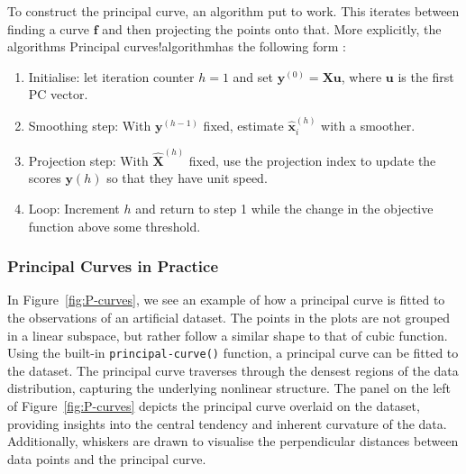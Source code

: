 \documentclass{article}\usepackage[]{graphicx}\usepackage[]{xcolor}
\numberwithin{equation}{section}
\begin{document}
\noindent To construct the principal curve, an algorithm put to work. This iterates between finding a curve $\mathbf{f}$ and then projecting the points onto that. More explicitly, the algorithms {Principal curves!algorithm}has the following form \cite{jolliffe2003principal}: 

\begin{enumerate}
  \item Initialise: let iteration counter $h = 1$ and set $\mathbf{y}^{(0)} = \mathbf{Xu}$, where $\mathbf{u}$ is the first PC vector. 
  \item Smoothing step: With $\mathbf{y}^{(h-1)}$ fixed, estimate $\mathbf{\hat{x}}_i^{(h)}$ with a smoother. 
  \item Projection step: With $\mathbf{\hat{X}}^{(h)}$ fixed, use the projection index to update the scores $\mathbf{y}{(h)}$ so that they have unit speed. 
  \item Loop: Increment $h$ and return to step 1 while the change in the objective function above some threshold.
\end{enumerate}

\subsubsection{Principal Curves in Practice}

\noindent In Figure~\ref{fig:P-curves}, we see an example of how a principal curve is fitted to the observations of an artificial dataset. The points in the plots are not grouped in a linear subspace, but rather follow a similar shape to that of cubic function.\\

\noindent Using the built-in \texttt{principal-curve()} function, a principal curve can be fitted to the dataset. The principal curve traverses through the densest regions of the data distribution, capturing the underlying nonlinear structure. The panel on the left of Figure~\ref{fig:P-curves} depicts the principal curve overlaid on the dataset, providing insights into the central tendency and inherent curvature of the data. Additionally, whiskers are drawn to visualise the perpendicular distances between data points and the principal curve.
\end{document}
